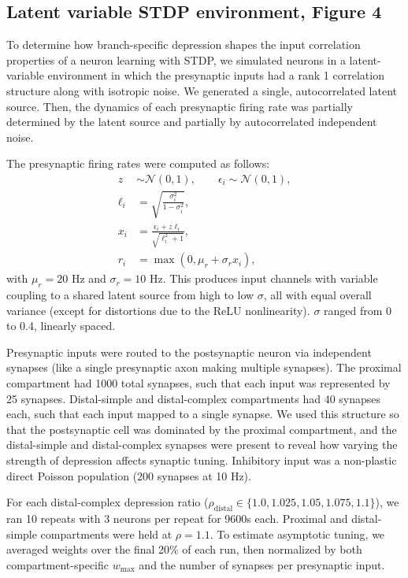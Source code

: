 \subsection*{Latent variable STDP environment, Figure 4}

To determine how branch-specific depression shapes the input correlation properties of a neuron learning with STDP, we simulated neurons in a latent-variable environment in which the presynaptic inputs had a rank 1 correlation structure along with isotropic noise. We generated a single, autocorrelated latent source. Then, the dynamics of each presynaptic firing rate was partially determined by the latent source and partially by autocorrelated independent noise.

The presynaptic firing rates were computed as follows: 
\begin{align*}
z &\sim \mathcal{N}(0,1), \qquad \epsilon_i \sim \mathcal{N}(0,1),\\
\ell_i &= \sqrt{\frac{\sigma_i^2}{1-\sigma_i^2}},\\
x_i &= \frac{\epsilon_i + z\ell_i}{\sqrt{\ell_i^2+1}},\\
r_i &= \max\!\left(0,\mu_r+\sigma_r x_i\right),
\end{align*}
with $\mu_r=20$ Hz and $\sigma_r=10$ Hz. This produces input channels with variable coupling to a shared latent source from high to low $\sigma$, all with equal overall variance (except for distortions due to the ReLU nonlinearity). $\sigma$ ranged from 0 to 0.4, linearly spaced.

Presynaptic inputs were routed to the postsynaptic neuron via independent synapses (like a single presynaptic axon making multiple synapses). The proximal compartment had 1000 total synapses, such that each input was represented by 25 synapses. Distal-simple and distal-complex compartments had 40 synapses each, such that each input mapped to a single synapse. We used this structure so that the postsynaptic cell was dominated by the proximal compartment, and the distal-simple and distal-complex synapses were present to reveal how varying the strength of depression affects synaptic tuning. Inhibitory input was a non-plastic direct Poisson population (200 synapses at 10 Hz).

For each distal-complex depression ratio ($\rho_{\mathrm{distal}}\in\{1.0,1.025,1.05,1.075,1.1\}$), we ran 10 repeats with 3 neurons per repeat for 9600s each. Proximal and distal-simple compartments were held at $\rho=1.1$. To estimate asymptotic tuning, we averaged weights over the final 20\% of each run, then normalized by both compartment-specific $w_{\max}$ and the number of synapses per presynaptic input.


